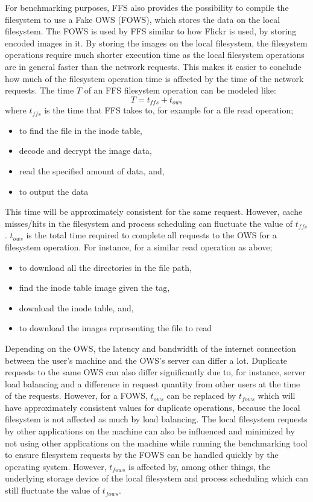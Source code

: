 For benchmarking purposes, FFS also provides the possibility to compile the filesystem to use a Fake OWS (FOWS), which stores the data on the local filesystem. The FOWS is used by FFS similar to how Flickr is used, by storing encoded images in it. By storing the images on the local filesystem, the filesystem operations require much shorter execution time as the local filesystem operations are in general faster than the network requests. This makes it easier to conclude how much of the filesystem operation time is affected by the time of the network requests. The time $T$ of an FFS filesystem operation can be modeled like:
$$
	T = t_{ffs} + t_{ows}
$$
where $t_{ffs}$ is the time that FFS takes to, for example for a file read operation;
\begin{itemize}
	\item to find the file in the inode table,
	\item decode and decrypt the image data,
	\item read the specified amount of data, and,
	\item to output the data
\end{itemize}
This time will be approximately consistent for the same request. However, cache misses/hits in the filesystem and process scheduling can fluctuate the value of $t_{ffs}$. $t_{ows}$ is the total time required to complete all requests to the OWS for a filesystem operation. For instance, for a similar read operation as above;
\begin{itemize}
	\item to download all the directories in the file path,
	\item find the inode table image given the tag,
	\item download the inode table, and,
	\item to download the images representing the file to read
\end{itemize}
Depending on the OWS, the latency and bandwidth of the internet connection between the user's machine and the OWS's server can differ a lot. Duplicate requests to the same OWS can also differ significantly due to, for instance, server load balancing and a difference in request quantity from other users at the time of the requests. However, for a FOWS, $t_{ows}$ can be replaced by $t_{fows}$ which will have approximately consistent values for duplicate operations, because the local filesystem is not affected as much by load balancing. The local filesystem requests by other applications on the machine can also be influenced and minimized by not using other applications on the machine while running the benchmarking tool to ensure filesystem requests by the FOWS can be handled quickly by the operating system. However, $t_{fows}$ is affected by, among other things, the underlying storage device of the local filesystem and process scheduling which can still fluctuate the value of $t_{fows}$.

